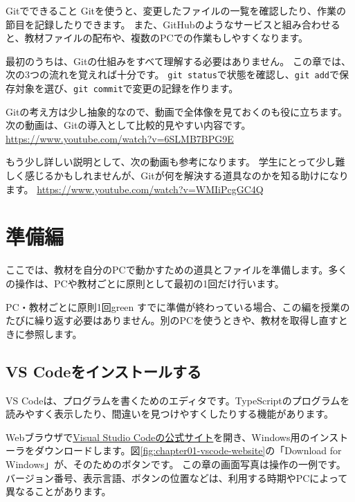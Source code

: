 \begin{pointbox}{Gitでできること}
Gitを使うと、変更したファイルの一覧を確認したり、作業の節目を記録したりできます。
また、GitHubのようなサービスと組み合わせると、教材ファイルの配布や、複数のPCでの作業もしやすくなります。
\end{pointbox}

最初のうちは、Gitの仕組みをすべて理解する必要はありません。
この章では、次の3つの流れを覚えれば十分です。
\texttt{git status}で状態を確認し、\texttt{git add}で保存対象を選び、\texttt{git commit}で変更の記録を作ります。

Gitの考え方は少し抽象的なので、動画で全体像を見ておくのも役に立ちます。
次の動画は、Gitの導入として比較的見やすい内容です。
\url{https://www.youtube.com/watch?v=6SLMB7BPG9E}

もう少し詳しい説明として、次の動画も参考になります。
学生にとって少し難しく感じるかもしれませんが、Gitが何を解決する道具なのかを知る助けになります。
\url{https://www.youtube.com/watch?v=WMIiPcgGC4Q}

\section{準備編}
ここでは、教材を自分のPCで動かすための道具とファイルを準備します。多くの操作は、PCや教材ごとに原則として最初の1回だけ行います。

\begin{chapterphasebox}{PC・教材ごとに原則1回}{green}
すでに準備が終わっている場合、この編を授業のたびに繰り返す必要はありません。別のPCを使うときや、教材を取得し直すときに参照します。
\end{chapterphasebox}

\subsection{VS Codeをインストールする}

VS Codeは、プログラムを書くためのエディタです。TypeScriptのプログラムを読みやすく表示したり、間違いを見つけやすくしたりする機能があります。


Webブラウザで\href{https://code.visualstudio.com/}{Visual Studio Codeの公式サイト}を開き、Windows用のインストーラをダウンロードします。図\ref{fig:chapter01-vscode-website}の「Download for Windows」が、そのためのボタンです。
この章の画面写真は操作の一例です。バージョン番号、表示言語、ボタンの位置などは、利用する時期やPCによって異なることがあります。

